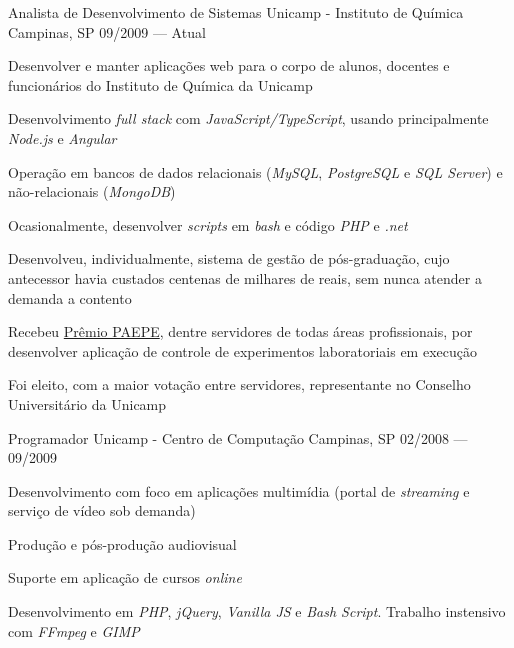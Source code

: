 

\begin{cventries}

  \cventry
    {Analista de Desenvolvimento de Sistemas} %
    {Unicamp - Instituto de Química} %
    {Campinas, SP} %
    {09/2009 — Atual} %
    {
      \begin{cvitems} %
        \item {Desenvolver e manter aplicações web para o corpo de alunos, docentes e funcionários do Instituto de Química da Unicamp}
        \item {Desenvolvimento \textit{full stack} com \textit{JavaScript/TypeScript}, usando principalmente \textit{Node.js} e \textit{Angular}}
        \item {Operação em bancos de dados relacionais (\textit{MySQL}, \textit{PostgreSQL} e \textit{SQL Server}) e não-relacionais (\textit{MongoDB})}
        \item {Ocasionalmente, desenvolver \textit{scripts} em \textit{bash} e código \textit{PHP} e \textit{.net}}
        \item {Desenvolveu, individualmente, sistema de gestão de pós-graduação, cujo antecessor havia custados centenas de milhares de reais, sem nunca atender a demanda a contento}
        \item {Recebeu \href{https://www.dgrh.unicamp.br/premiopaepe}{Prêmio PAEPE}, dentre servidores de todas áreas profissionais, por desenvolver aplicação de controle de experimentos laboratoriais em execução}
        \item {Foi eleito, com a maior votação entre servidores, representante no Conselho Universitário da Unicamp}
      \end{cvitems}
    }

  \cventry
    {Programador} %
    {Unicamp - Centro de Computação} %
    {Campinas, SP} %
    {02/2008 — 09/2009} %
    {
      \begin{cvitems} %
        \item {Desenvolvimento com foco em aplicações multimídia (portal de \textit{streaming} e serviço de vídeo sob demanda)}
        \item {Produção e pós-produção audiovisual}
        \item {Suporte em aplicação de cursos \textit{online}}
        \item {Desenvolvimento em \textit{PHP}, \textit{jQuery}, \textit{Vanilla JS} e \textit{Bash Script}. Trabalho instensivo com \textit{FFmpeg} e \textit{GIMP}}
      \end{cvitems}
    }

\end{cventries}
